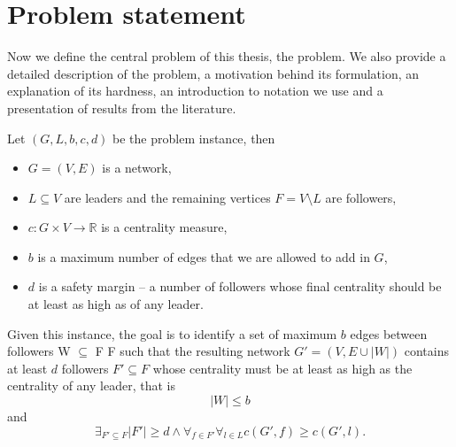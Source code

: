 \chapter{Problem statement}\label{chapter:ProblemStatement}

Now we define the central problem of this thesis, the \HL problem.
We also provide a detailed description of the problem, a motivation behind its formulation,
an explanation of its hardness, an introduction to notation we use and a presentation of results from the literature. 

\vspace{2.5mm}
\begin{tcolorbox}[
    enhanced, skin=enhancedmiddle,
    arc=0pt, outer arc=0pt,
    frame hidden, %
    colback=backgroundgray!10,
    boxsep=0mm,
    borderline={0.75mm}{0mm}{decoration}, borderline={0.75mm}{0.75mm}{backgroundgray},
]
\begin{definition}[\HL]\label{def:HL}
    Let $(G, L, b, c, d)$ be the problem instance, then
    \begin{itemize}
        \item $G = (V, E)$ is a network,
        \item $L \subseteq V$ are leaders and the remaining vertices $F = V \setminus L$ are followers,
        \item $c : G \times V \rightarrow \mathbb{R}$ is a centrality measure,
        \item $b$ is a maximum number of edges that we are allowed to add in $G$,
        \item $d$ is a safety margin -- a number of followers whose final centrality should be at least as high as of any leader.
    \end{itemize}
    Given this instance, the goal is to identify a set of maximum $b$ edges between followers W $\subseteq$ F {\texttimes} F
    such that the resulting network $G' = (V, E \cup |W|)$ contains at least $d$ followers $F' \subseteq F$
    whose centrality must be at least as high as the centrality of any leader, that is
    $$|W| \leq b$$
    and
    $$\exists_{F' \subseteq F} |F'| \geq d \wedge \forall_{f \in F'} \forall_{l \in L} c(G', f) \geq c(G', l).$$
\end{definition}
\end{tcolorbox}
\vspace{2.5mm}

